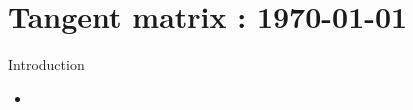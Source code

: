 




	\tableofcontents

\section{Tangent matrix : \today}
\begin{frame}{Introduction}
	\begin{itemize}
		\item 
		
	\end{itemize}
\end{frame}
	
